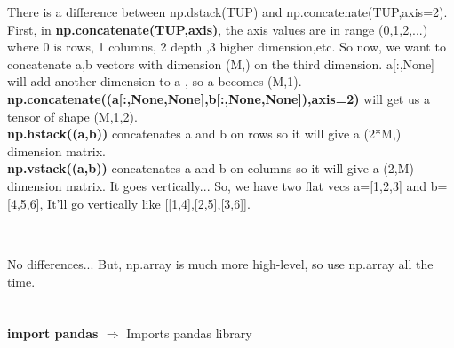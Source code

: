 \documentclass[a4paper,18pt]{article}
\begin{document}
There is a difference between np.dstack(TUP) and np.concatenate(TUP,axis=2). First, in \textbf{np.concatenate(TUP,axis)}, the axis values are in range (0,1,2,...) where 0 is rows, 1 columns, 2 depth ,3 higher dimension,etc. So now, we want to concatenate a,b vectors with dimension (M,) on the third dimension. a[:,None] will add another dimension to a , so a becomes (M,1).  \textbf{np.concatenate((a[:,None,None],b[:,None,None]),axis=2)} will get us a tensor of shape (M,1,2).\\

\textbf{np.hstack((a,b))} concatenates a and b on rows so it will give a (2*M,) dimension matrix.\\

\textbf{np.vstack((a,b))} concatenates a and b on columns so it will give a (2,M) dimension matrix. It goes vertically... So, we have two flat vecs a=[1,2,3] and b=[4,5,6],
It'll go vertically like [[1,4],[2,5],[3,6]].\\\\


\subsection{\colorbox {matgreen}{\color{white}{\large np.ndarray VS np.array}}}
No differences... But, np.array is much more high-level, so use np.array all the time.


\newpage

\section{\colorbox {Abi}{}}
\subsection{\colorbox {matgreen}{\color{white}{\large import pandas}}}
\textbf{import pandas $\Rightarrow$} Imports pandas library\\\\

\end{document}
